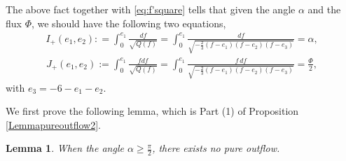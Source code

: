 \documentclass[reqno,12pt]{amsart}
\newtheorem{lemma}[theorem]{Lemma}
\begin{document}


The above fact together with \eqref{eq:f'square} tells  that given the angle $\alpha$ and the flux $\Phi$, we should have the following two equations,
 \begin{align}\label{angle}
 I_{+}(e_1, e_2): = \int_0^{e_1} \frac{df}{\sqrt{Q(f)}} = \int_0^{e_1} \frac{df}{\sqrt{-\frac23 (f - e_1)(f-e_2) (f-e_3)} }  = \alpha,
  \end{align}
  \begin{align}\label{flux}
J_{+}(e_1, e_2) :=   \int_0^{e_1} \frac{f df}{\sqrt{Q(f)}} = \int_0^{e_1} \frac{f\, df }{\sqrt{-\frac23 (f - e_1)(f-e_2) (f-e_3)} }  = \frac{\Phi}{2}, 
  \end{align}
with $e_3 = -6-e_1 -e_2. $

We first prove the following lemma, which is Part (1) of Proposition \ref{Lemmapureoutflow2}.
  \begin{lemma}\label{nonexistence} When the angle $\alpha \geq \frac{\pi}{2}$, there exists no pure outflow.       
  \end{lemma}
\end{document}
